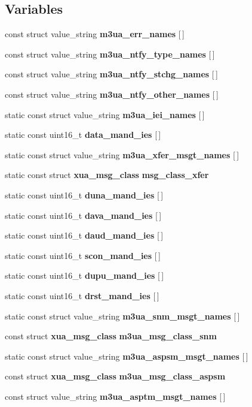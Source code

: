\subsection*{Variables}
\begin{DoxyCompactItemize}
\item 
const struct value\+\_\+string {\bf m3ua\+\_\+err\+\_\+names} [$\,$]
\item 
const struct value\+\_\+string {\bf m3ua\+\_\+ntfy\+\_\+type\+\_\+names} [$\,$]
\item 
const struct value\+\_\+string {\bf m3ua\+\_\+ntfy\+\_\+stchg\+\_\+names} [$\,$]
\item 
const struct value\+\_\+string {\bf m3ua\+\_\+ntfy\+\_\+other\+\_\+names} [$\,$]
\item 
static const struct value\+\_\+string {\bf m3ua\+\_\+iei\+\_\+names} [$\,$]
\item 
static const uint16\+\_\+t {\bf data\+\_\+mand\+\_\+ies} [$\,$]
\item 
static const struct value\+\_\+string {\bf m3ua\+\_\+xfer\+\_\+msgt\+\_\+names} [$\,$]
\item 
static const struct {\bf xua\+\_\+msg\+\_\+class} {\bf msg\+\_\+class\+\_\+xfer}
\item 
static const uint16\+\_\+t {\bf duna\+\_\+mand\+\_\+ies} [$\,$]
\item 
static const uint16\+\_\+t {\bf dava\+\_\+mand\+\_\+ies} [$\,$]
\item 
static const uint16\+\_\+t {\bf daud\+\_\+mand\+\_\+ies} [$\,$]
\item 
static const uint16\+\_\+t {\bf scon\+\_\+mand\+\_\+ies} [$\,$]
\item 
static const uint16\+\_\+t {\bf dupu\+\_\+mand\+\_\+ies} [$\,$]
\item 
static const uint16\+\_\+t {\bf drst\+\_\+mand\+\_\+ies} [$\,$]
\item 
static const struct value\+\_\+string {\bf m3ua\+\_\+snm\+\_\+msgt\+\_\+names} [$\,$]
\item 
const struct {\bf xua\+\_\+msg\+\_\+class} {\bf m3ua\+\_\+msg\+\_\+class\+\_\+snm}
\item 
static const struct value\+\_\+string {\bf m3ua\+\_\+aspsm\+\_\+msgt\+\_\+names} [$\,$]
\item 
const struct {\bf xua\+\_\+msg\+\_\+class} {\bf m3ua\+\_\+msg\+\_\+class\+\_\+aspsm}
\item 
const struct value\+\_\+string {\bf m3ua\+\_\+asptm\+\_\+msgt\+\_\+names} [$\,$]
\item 

\end{DoxyCompactItemize}
